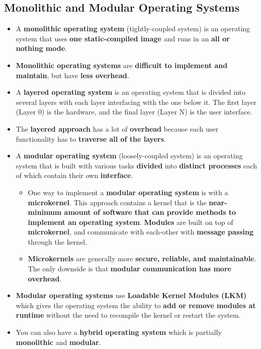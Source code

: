 \documentclass[16pt]{article}
\begin{document}
    \subsection*{Monolithic and Modular Operating Systems}
    \begin{itemize}
        \item A \textbf{monolithic operating system} (tightly-coupled system) is an operating system that uses \textbf{one static-compiled image} and runs in an \textbf{all or nothing mode}.
        \item \textbf{Monolithic operating systems} are \textbf{difficult to implement and maintain}, but have \textbf{less overhead}.
        \item A \textbf{layered operating system} is an operating system that is divided into several layers with each layer interfacing with the one below it. The first layer (Layer 0) is the hardware, and the final layer (Layer N) is the user interface.
        \item The \textbf{layered approach} has a lot of \textbf{overhead} because each user functionality has to \textbf{traverse all of the layers}.
        \item A \textbf{modular operating system} (loosely-coupled system) is an operating system that is built with various tasks \textbf{divided} into \textbf{distinct processes} each of which contain their own \textbf{interface}.
        \begin{itemize}
            \item One way to implement a \textbf{modular operating system} is with a \textbf{microkernel}. This approach contains a kernel that is the \textbf{near-minimum amount of software that can provide methods to implement an operating system}. \textbf{Modules} are built on top of \textbf{microkernel}, and communicate with each-other with \textbf{message passing} through the kernel.
            \item \textbf{Microkernels} are generally more \textbf{secure, reliable, and maintainable}. The only downside is that \textbf{modular communication has more overhead}.
        \end{itemize}
        \item \textbf{Modular operating systems} use \textbf{Loadable Kernel Modules (LKM)} which gives the operating system the ability to \textbf{add or remove modules at runtime} without the need to recompile the kernel or restart the system.
        \item You can also have a \textbf{hybrid operating system} which is partially \textbf{monolithic} and \textbf{modular}.
    \end{itemize}
\end{document}
